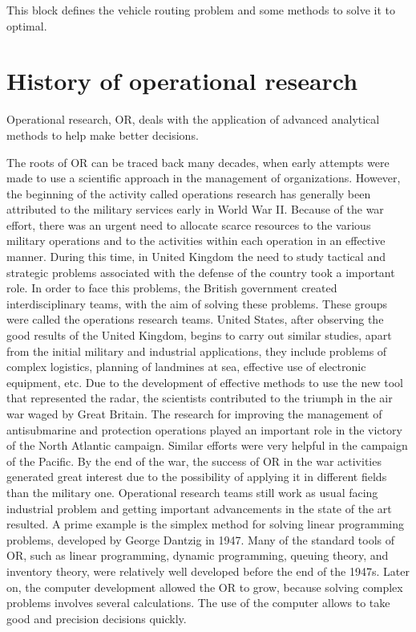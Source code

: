 
This block defines the vehicle routing problem and some methods to solve it to optimal.

\section{History of operational research}
Operational research, OR, deals with the application of advanced analytical methods to help make better decisions. %

The roots of OR can be traced back many decades, when early attempts were made
to use a scientific approach in the management of organizations. However, the beginning
of the activity called operations research has generally been attributed to the military services
early in World War II. Because of the war effort, there was an urgent need to allocate
scarce resources to the various military operations and to the activities within each
operation in an effective manner. During this time, in United Kingdom the need to study tactical and strategic problems associated with the defense of the country took a important role. In order to face this problems, the British government created interdisciplinary teams,
with the aim of solving these problems. These groups were called the operations research teams. United States, after observing the good results of the United Kingdom, begins to carry out similar studies, apart from the initial military and industrial applications, they include problems of complex logistics, planning of landmines at sea, effective use of
electronic equipment, etc. Due to the development of effective methods to use
the new tool that represented the radar, the scientists contributed
to the triumph in the air war waged by Great Britain. The research for
improving the management of antisubmarine and protection operations played an important role in the victory of the North Atlantic campaign.
Similar efforts were very helpful in the campaign of the Pacific. By the end of the 
war, the success of OR in the war activities generated great interest
due to the possibility of applying it in different fields than the military one. Operational research teams still work as usual facing industrial problem and getting important advancements in the state of the art resulted. A prime example is the simplex method for solving linear programming problems, developed by George Dantzig in 1947. Many of the standard tools of OR, such as linear programming, dynamic programming, queuing theory, and inventory theory, were relatively well developed before
the end of the 1947s. Later on, the computer development allowed the OR to grow, because solving complex problems involves several calculations. The use of the computer allows to take good and precision decisions quickly.

